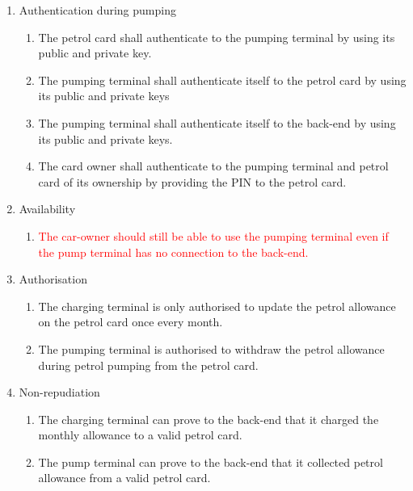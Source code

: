 \begin{enumerate}
\item Authentication during pumping
	\begin{enumerate}
	\item The petrol card shall authenticate to the pumping terminal by using its public and private key. %
	\item The pumping terminal shall authenticate itself to the petrol card by using its public and private keys
	\item The pumping terminal shall authenticate itself to the back-end by using its public and private keys.
	\item The card owner shall authenticate to the pumping terminal and petrol card of its ownership by providing the PIN to the petrol card.
	\end{enumerate}		


\item Availability
	\begin{enumerate}
	\item \textcolor{red}{The car-owner should still be able to use the pumping terminal even if the pump terminal has no connection to the back-end.}
	\end{enumerate}	


\item Authorisation
	\begin{enumerate}
	\item The charging terminal is only authorised to update the petrol allowance on the petrol card once every month.
	\item The pumping terminal is authorised to withdraw the petrol allowance during petrol pumping from the petrol card.
	\end{enumerate}


\item Non-repudiation
	\begin{enumerate}
		\item The charging terminal can prove to the back-end that it charged the monthly allowance to a valid petrol card. 
		\item The pump terminal can prove to the back-end that it collected petrol allowance from a valid petrol card.
	\end{enumerate}

\end{enumerate}

